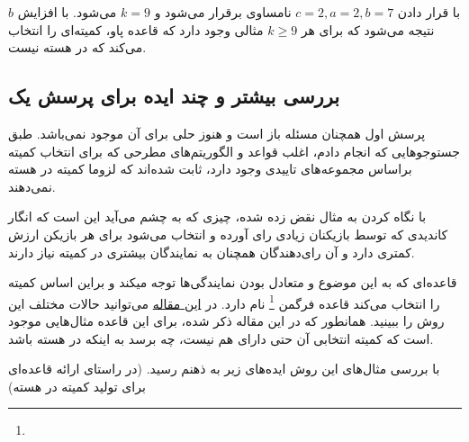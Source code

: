 \documentclass[12pt]{article}
\begin{document}
با قرار دادن 
$c = 2, a = 2, b = 7$
نامساوی برقرار می‌شود و $k = 9$
می‌شود. با افزایش $b$
نتیجه می‌شود که برای هر 
$k \ge 9$
مثالی وجود دارد که قاعده پاو، کمیته‌ای را انتخاب می‌کند که در هسته نیست.

\subsection{بررسی بیشتر و چند ایده برای پرسش یک}
پرسش اول همچنان مسئله باز است و هنوز حلی برای آن موجود نمی‌باشد.
طبق جستوجوهایی که انجام دادم، اغلب قواعد و الگوریتم‌های مطرحی که برای انتخاب
کمیته براساس مجموعه‌های تاییدی وجود دارد،
ثابت شده‌اند که
لزوما کمیته در هسته نمی‌دهند. 

با نگاه کردن به مثال نقض زده شده، چیزی که به چشم می‌آید این است که 
انگار کاندیدی که توسط بازیکنان زیادی رای آورده و انتخاب می‌شود
برای هر بازیکن ارزش کمتری دارد و آن رای‌دهندگان همچنان به نمایندگان بیشتری در کمیته
نیاز دارند. 

قاعده‌ای که به این موضوع و متعادل بودن نمایندگی‌ها توجه میکند و براین اساس کمیته را انتخاب می‌کند
قاعده
فرگمن 
\footnote{
}
نام دارد. در 
\href{https://arxiv.org/abs/2102.12305}{این مقاله}
می‌توانید حالات مختلف این روش را ببینید. همانطور که در این مقاله ذکر شده، برای این قاعده مثال‌هایی موجود است که کمیته
انتخابی آن حتی دارای
هم نیست، چه برسد به اینکه در هسته باشد.

با بررسی مثال‌های این روش ایده‌های زیر به ذهنم رسید. (در راستای ارائه قاعده‌ای برای تولید کمیته در هسته)
\end{document}
